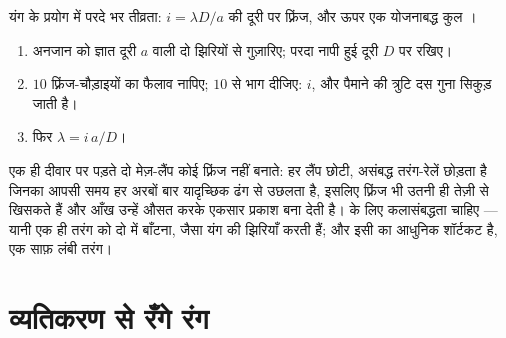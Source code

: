 \begin{omfigure}

{\small यंग के प्रयोग में परदे भर तीव्रता: $i = \lambda D/a$ की दूरी पर फ़्रिंज, और
ऊपर एक योजनाबद्ध कुल ।}
\end{omfigure}

\begin{method}[तरंगदैर्घ्य नापना]\label{met:g12:light-as-wave:lambda}
\begin{enumerate}
  \item अनजान  को ज्ञात दूरी $a$ वाली दो झिरियों से
        गुज़ारिए; परदा नापी हुई दूरी $D$ पर रखिए।
  \item $10$ फ़्रिंज-चौड़ाइयों का फैलाव नापिए; $10$ से भाग
        दीजिए:  $i$, और पैमाने की त्रुटि दस गुना
        सिकुड़ जाती है।
  \item फिर $\lambda = i\,a/D$।
\end{enumerate}
\end{method}

\begin{remark}\label{rem:g12:light-as-wave:lamps}
एक ही दीवार पर पड़ते दो मेज़-लैंप कोई फ़्रिंज नहीं बनाते: हर लैंप छोटी,
असंबद्ध तरंग-रेलें छोड़ता है जिनका आपसी समय हर  अरबों बार
यादृच्छिक ढंग से उछलता है, इसलिए फ़्रिंज भी उतनी ही तेज़ी से खिसकते हैं और
आँख उन्हें औसत करके एकसार प्रकाश बना देती है।  के लिए
कलासंबद्धता चाहिए --- यानी एक ही तरंग को दो में बाँटना,
जैसा यंग की झिरियाँ करती हैं; और  इसी का आधुनिक शॉर्टकट है, एक
साफ़ लंबी तरंग।
\end{remark}

\section{व्यतिकरण से रँगे रंग}

